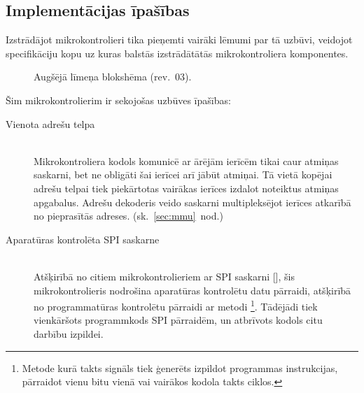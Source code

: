 \subsection{Implementācijas īpašības} \label{sec:design}
Izstrādājot mikrokontrolieri tika pieņemti vairāki lēmumi par tā uzbūvi,
veidojot specifikāciju kopu uz kuras
balstās izstrādātātās mikrokontroliera komponentes. \todo \\
\begin{figure}[bhp]
	\centering
	\def\svgwidth{\textwidth}
	{}
	\caption{Augšējā līmeņa blokshēma (rev.~03).}
	\label{fig:top-rev3}
\end{figure}
Šim mikrokontrolierim ir sekojošas uzbūves īpašības:
\begin{description}
	\item[Vienota adrešu telpa] \hfill \\
		Mikrokontroliera kodols komunicē ar ārējām ierīcēm tikai caur
		atmiņas saskarni, bet ne obligāti šai ierīcei arī jābūt atmiņai.
		Tā vietā kopējai adrešu telpai tiek piekārtotas vairākas ierīces
		izdalot noteiktus atmiņas apgabalus. Adrešu dekoderis veido saskarni
		multipleksējot ierīces atkarībā no pieprasītās adreses.
		(sk.~\ref{sec:mmu}~nod.)\pagebreak[1]
	\item[Aparatūras kontrolēta SPI saskarne] \hfill \\
		Atšķirībā no citiem mikrokontrolieriem ar SPI saskarni
		[\todo ], %
		šis mikro\-kontrolieris nodrošina aparatūras kontrolētu datu pārraidi,
		atšķirībā no programmatūras kontrolētu pārraidi ar
		 metodi%
		\footnote{Metode kurā takts signāls tiek ģenerēts izpildot programmas
			instrukcijas, pārraidot vienu bitu vienā vai vairākos kodola takts ciklos.}.
		Tādējādi tiek vienkāršots programmkods SPI pārraidēm, un atbrīvots
		kodols citu darbību izpildei.
	\item[] \todo
\end{description}

